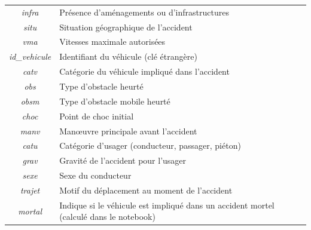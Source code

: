 \documentclass{article}
\begin{document}
\begin{center}
\begin{tabular}{ |c|p{9cm}| }
            \textit{infra} & Présence d'aménagements ou d'infrastructures \\
            \textit{situ} & Situation géographique de l'accident \\
            \textit{vma} & Vitesses maximale autorisées \\
            \textit{id\_vehicule} & Identifiant du véhicule (clé étrangère) \\
            \textit{catv} & Catégorie du véhicule impliqué dans l'accident \\
            \textit{obs} & Type d'obstacle heurté \\
            \textit{obsm} & Type d'obstacle mobile heurté \\
            \textit{choc} & Point de choc initial \\
            \textit{manv} & Manœuvre principale avant l'accident \\
            \textit{catu} & Catégorie d'usager (conducteur, passager, piéton) \\
            \textit{grav} & Gravité de l'accident pour l'usager \\
            \textit{sexe} & Sexe du conducteur \\
            \textit{trajet} & Motif du déplacement au moment de l'accident \\
            \textit{mortal} & Indique si le véhicule est impliqué dans un accident mortel (calculé dans le notebook) \\
            \hline
        \end{tabular}
    \end{center}
    \newpage
\end{document}
